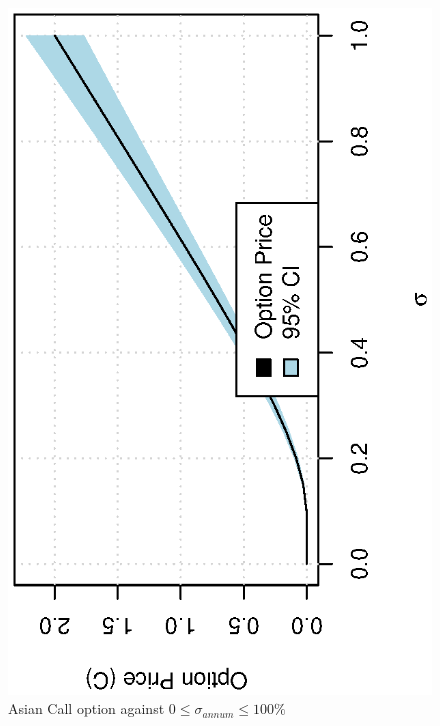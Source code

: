 \documentclass[12pt,a4paper]{article}
\begin{document}
\begin{figure}[!ht]
  \centering
  \includegraphics[scale=0.85,angle=-90]{./images/pseudo/priceOptionSigma100.eps}
  \caption{Asian Call option against $0\leq \sigma_{annum} \leq 100 \%$}
  \label{fig:sigma1_brackets}
\end{figure}
\end{document}
